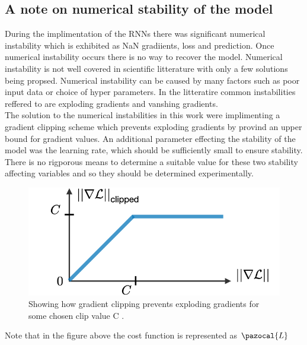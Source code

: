 \documentclass{article}
\begin{document}
\subsection{A note on numerical stability of the model}
During the implimentation of the RNNs there was significant numerical instability which is exhibited as NaN gradiients, loss and prediction. Once numerical instability occurs there is no way to recover the model. Numerical instability is not well covered in scientific litterature with only a few solutions being propsed. Numerical instability can be caused by many factors such as poor input data or choice of hyper parameters. In the litteratire common instabilities reffered to are exploding gradients and vanshing gradients. \\
The solution to the numerical instabilities in this work were implimenting a gradient clipping scheme which prevents exploding gradients by provind an upper bound for gradient values. An additional parameter effecting the stability of the model was the learning rate, which should be sufficiently small to ensure stability. There is no rigporous means to determine a suitable value for these two stability affecting variables and so they should be determined experimentally. 
\begin{figure}[H]
\caption{Showing how gradient clipping prevents exploding gradients for some chosen clip value C \cite{stanford}. }
\includegraphics[scale=0.35]{gradient_clipping.png}
\end{figure}
Note that in the figure above the cost function is represented as $\pazocal{L}$
\end{document}
